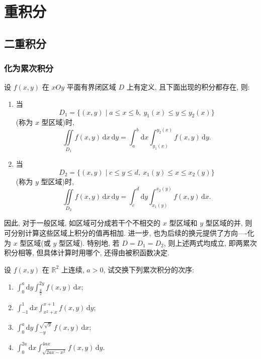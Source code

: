 \setcounter{chapter}{11}
\pagestyle{fancy}

\chapter{重积分}


\section{二重积分}


\subsection{化为累次积分}

设 $f(x,y)$ 在 $xOy$ 平面有界闭区域 $D$ 上有定义, 且下面出现的积分都存在, 则:

\begin{enumerate}
    \item 当
          \[
              D_1=\{(x,y)\mid a\leq x\leq b,\ y_1(x)\leq y\leq y_2(x)\}
          \]
          (称为 $x$ 型区域)时,
          \[
              \displaystyle\iint\limits_{D_1}f(x,y)\,\mathrm{d}x\,\mathrm{d}y
              =\int_a^b\mathrm{d}x\int_{y_1(x)}^{y_2(x)}f(x,y)\,\mathrm{d}y.
          \]

    \item 当
          \[
              D_2=\{(x,y)\mid c\leq y\leq d,\ x_1(y)\leq x\leq x_2(y)\}
          \]
          (称为 $y$ 型区域)时,
          \[
              \displaystyle\iint\limits_{D_2}f(x,y)\,\mathrm{d}x\,\mathrm{d}y
              =\int_c^d\mathrm{d}y\int_{x_1(y)}^{x_2(y)}f(x,y)\,\mathrm{d}x.
          \]
\end{enumerate}

因此, 对于一般区域, 如区域可分成若干个不相交的 $x$ 型区域和 $y$ 型区域的并, 则可分别计算这些区域上积分的值再相加. 进一步, 也为后续的换元提供了方向----化为 $x$ 型区域(或 $y$ 型区域). 特别地, 若 $D=D_1=D_2$, 则上述两式均成立, 即两累次积分相等, 但具体计算时用哪个, 还得由被积函数决定.

\begin{example}
    设 $f(x,y)$ 在 $\mathbb{R}^2$ 上连续, $a>0$, 试交换下列累次积分的次序:
    \begin{enumerate}
        \item $\displaystyle\int_0^a\mathrm{d}y\int_{\frac{y}{2}}^{2y}f(x,y)\,\mathrm{d}x$;
        \item $\displaystyle\int_{-1}^1\mathrm{d}x\int_{x^2+x}^{x+1}f(x,y)\,\mathrm{d}y$;
        \item $\displaystyle\int_0^a\mathrm{d}y\int_{-y}^{\sqrt{\sqrt{y}}}f(x,y)\,\mathrm{d}x$;
        \item $\displaystyle\int_0^{2a}\mathrm{d}x\int_{\sqrt{2ax-x^2}}^{4ax}f(x,y)\,\mathrm{d}y$.
    \end{enumerate}
\end{example}
\exampleblank

